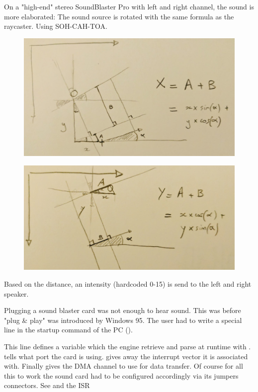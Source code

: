 On a "high-end" stereo SoundBlaster Pro with left and right channel, the sound is more elaborated: The sound source is rotated with the same formula as the raycaster. Using SOH-CAH-TOA.\\
\par
\begin{figure}[H]
\centering
 \includegraphics[width=\textwidth]{imgs/drawings/audio_y_rotate.png}
 \end{figure}
 \par
 \begin{figure}[H]
\centering
 \includegraphics[width=\textwidth]{imgs/drawings/audio_x_rotate.png}
 \end{figure}
\par
Based on the distance, an intensity (hardcoded 0-15) is send to the left and right speaker.\\
\par
{} Plugging a sound blaster card was not enough to hear sound. This was before "plug \& play" was introduced by Windows 95. The user had to write a special line in the startup command of the PC ().\\
\par 
\begin{minipage}{\textwidth}

\end{minipage}
\par
This line defines a variable  which the engine retrieve and parse at runtime with .  tells what port the card is using.  gives away the interrupt vector it is associated with. Finally  gives the DMA channel to use for data transfer. Of course for all this to work the sound card had to be configured accordingly via its jumpers connectors.
See  and the ISR  




